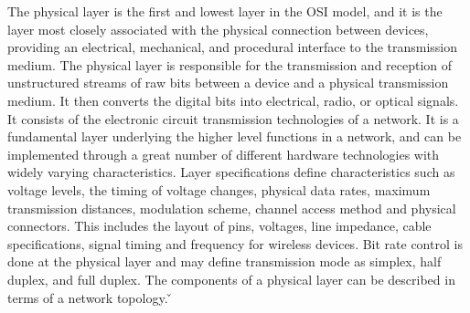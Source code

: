 The physical layer is the first and lowest layer in the OSI model, and it is the layer most closely associated with
the physical connection between devices, providing an electrical, mechanical, and procedural interface to the
transmission medium. The physical layer is responsible for the transmission and reception of unstructured streams of
raw bits between a device and a physical transmission medium. It then converts the digital bits into electrical,
radio, or optical signals. It consists of the electronic circuit transmission technologies of a network. It is a
fundamental layer underlying the higher level functions in a network, and can be implemented through a great number
of different hardware technologies with widely varying characteristics. Layer specifications define characteristics
such as voltage levels, the timing of voltage changes, physical data rates, maximum transmission distances,
modulation scheme, channel access method and physical connectors. This includes the layout of pins, voltages, line
impedance, cable specifications, signal timing and frequency for wireless devices. Bit rate control is done at the
physical layer and may define transmission mode as simplex, half duplex, and full duplex. The components of a
physical layer can be described in terms of a network topology. \v

